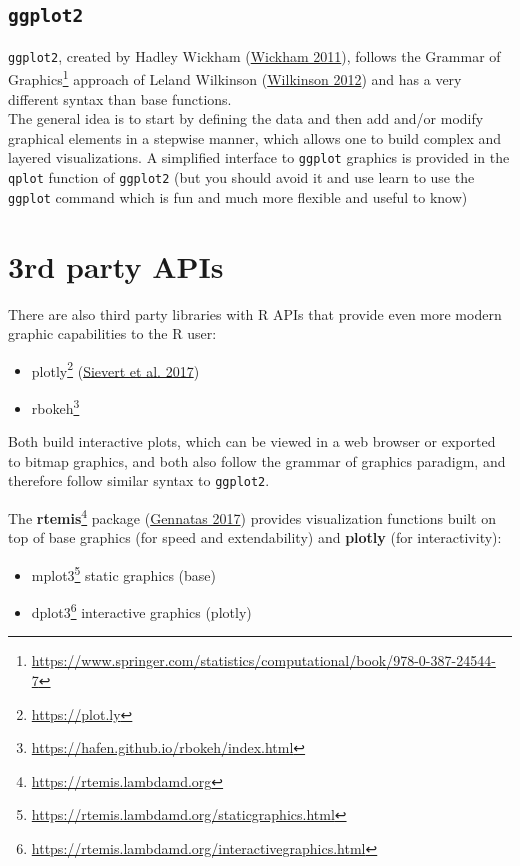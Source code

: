 \documentclass[
]{book}
\DeclareRobustCommand{\href}[2]{#2\footnote{\url{#1}}}
\providecommand{\tightlist}{%
  \setlength{\itemsep}{0pt}\setlength{\parskip}{0pt}}
\begin{document}
\hypertarget{ggplot2}{%
\subsection{\texorpdfstring{\texttt{ggplot2}}{ggplot2}}\label{ggplot2}}

\texttt{ggplot2}, created by Hadley Wickham (\protect\hyperlink{ref-wickham2011ggplot2}{Wickham 2011}), follows the \href{https://www.springer.com/statistics/computational/book/978-0-387-24544-7}{Grammar of Graphics} approach of Leland Wilkinson (\protect\hyperlink{ref-wilkinson2012grammar}{Wilkinson 2012}) and has a very different syntax than base functions.\\
The general idea is to start by defining the data and then add and/or modify graphical elements in a stepwise manner, which allows one to build complex and layered visualizations. A simplified interface to \texttt{ggplot} graphics is provided in the \texttt{qplot} function of \texttt{ggplot2} (but you should avoid it and use learn to use the \texttt{ggplot} command which is fun and much more flexible and useful to know)

\hypertarget{rd-party-apis}{%
\section{3rd party APIs}\label{rd-party-apis}}

There are also third party libraries with R APIs that provide even more modern graphic capabilities to the R user:

\begin{itemize}
\tightlist
\item
  \href{https://plot.ly}{plotly} (\protect\hyperlink{ref-sievert2017plotly}{Sievert et al. 2017})
\item
  \href{https://hafen.github.io/rbokeh/index.html}{rbokeh}
\end{itemize}

Both build interactive plots, which can be viewed in a web browser or exported to bitmap graphics, and both also follow the grammar of graphics paradigm, and therefore follow similar syntax to \texttt{ggplot2}.

The \href{https://rtemis.lambdamd.org}{\textbf{rtemis}} package (\protect\hyperlink{ref-gennatas2017towards}{Gennatas 2017}) provides visualization functions built on top of base graphics (for speed and extendability) and \textbf{plotly} (for interactivity):

\begin{itemize}
\tightlist
\item
  \href{https://rtemis.lambdamd.org/staticgraphics.html}{mplot3} static graphics (base)
\item
  \href{https://rtemis.lambdamd.org/interactivegraphics.html}{dplot3} interactive graphics (plotly)
\end{itemize}
\end{document}
